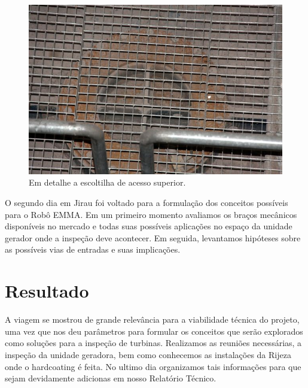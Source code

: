 \documentclass[a4paper,11pt,oneside,openany,brazilian,
version=last,draft=false,]{report}
\begin{document}
\begin{twocolumn}
\begin{figure}[H]
\centering
\includegraphics[width=\columnwidth]{Fotos/img_4978.jpg}
\caption{Em detalhe a escoltilha de acesso superior.}
\end{figure}

O segundo dia em Jirau foi voltado para a formulação dos conceitos possíveis
para o Robô EMMA. Em um primeiro momento avaliamos os braços mecânicos
disponíveis no mercado e todas suas possíveis aplicações no espaço da unidade
gerador onde a inspeção deve acontecer. Em seguida, levantamos hipóteses sobre
as possíveis vias de entradas e suas implicações. 

\section*{Resultado}
A viagem se mostrou de grande relevância para a viabilidade técnica do projeto,
uma vez que nos deu parâmetros para formular os conceitos que serão explorados
como soluções para a inspeção de turbinas. Realizamos as reuniões
necessárias, a inspeção da unidade geradora, bem como conhecemos as instalações
da Rijeza onde o hardcoating é feita. No ultimo dia organizamos tais informações
para que sejam devidamente adicionas em nosso Relatório Técnico.
\end{twocolumn}
\end{document}
